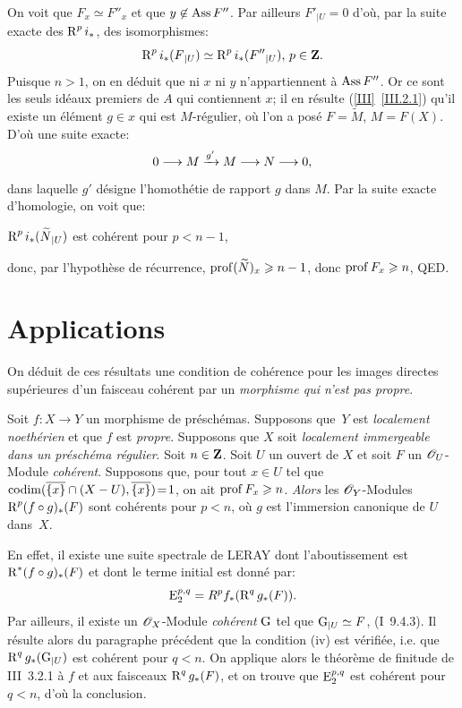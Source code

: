 \noindent On voit que $F_x\simeq F''_x$ et que $y\not\in \operatorname{Ass} F''$. Par ailleurs $F'{}_{|U}=0$ d'o\`u, par la suite exacte des $\operatorname{R}^pi_\ast$, des isomorphismes:
\[
\operatorname{R}^pi_\ast(F{}_{|U})\simeq \operatorname{R}^pi_\ast(F''{}_{|U})\text{, }p\in\mathbf{Z}.
\]
Puisque $n>1$, on en d\'eduit que ni $x$ ni $y$ n'appartiennent \`a $\operatorname{Ass} F''$. Or ce sont les seuls id\'eaux premiers de $A$ qui contiennent $x$; il en r\'esulte (\ref{III}~\ref{III.2.1}) qu'il existe un \'el\'ement $g\in x$ qui est $M$-r\'egulier, o\`u l'on a pos\'e $F=\widetilde{M}$, $M=F(X)$. D'o\`u une suite exacte:
\[0\to M\lto{g'} M\to N \to 0,
\]
dans laquelle $g'$ d\'esigne l'homoth\'etie de rapport $g$ dans $M$. Par la suite exacte d'homologie, on voit que:

$\operatorname{R}^pi_\ast(\widetilde{N}{}_{|U})$ est coh\'erent pour $p<n-1$,

\noindent donc, par l'hypoth\`ese de r\'ecurrence, $\operatorname{prof}(\widetilde{N})_x\geqslant n-1$, donc $\operatorname{prof} F_x\geqslant n$, QED.

\section{Applications} \label{VIII.3}

On d\'eduit de ces r\'esultats une condition de coh\'erence pour les images directes sup\'erieures d'un faisceau coh\'erent par un \emph{morphisme qui n'est pas propre}.

\begin{theoreme} \label{VIII.3.1}
Soit $f\colon X\to Y$ un morphisme de pr\'esch\'emas. Supposons que~$Y$ est \emph{localement noethérien} et que $f$ est \emph{propre}. Supposons que $X$ soit \emph{localement immergeable dans un préschéma régulier}. Soit $n\in\mathbf{Z}$. Soit $U$ un ouvert de $X$ et soit $F$ un ${\mathscr O}_U$-Module \emph{cohérent}. Supposons que, pour tout $x\in U$ tel que \hbox{$\operatorname{codim}(\overline{\{x\}}\cap (X-U), \overline{\{x\}})\!=\!1$}, on ait $\operatorname{prof} F_x\geqslant n$. \emph{Alors} les ${\mathscr O}_Y$-Modules \hbox{$\operatorname{R}^p(f\circ g)_\ast(F)$} sont coh\'erents pour $p<n$, o\`u $g$ est l'immersion canonique de $U$ dans~$X$.
\end{theoreme}

En effet, il existe une suite spectrale de LERAY dont l'aboutissement est $\operatorname{R}^\ast(f\circ g)_\ast(F)$ et dont le terme initial est donn\'e par:
\[
\operatorname{E}^{p, q}_2=R^pf_\ast(\operatorname{R}^qg_\ast(F)).
\]
Par ailleurs, il existe un $\mathscr{O}_X$-Module \emph{cohérent} ${\operatorname{G}}$ tel que ${\operatorname{G}}{}_{|U}\simeq F$, (\EGA I~9.4.3). Il r\'esulte alors du paragraphe pr\'ec\'edent que la condition (iv) \ignorespaces est v\'erifi\'ee, i.e. que $\operatorname{R}^qg_\ast({\operatorname{G}}{}_{|U})$ est coh\'erent pour $q<n$. On applique alors le th\'eor\`eme de finitude de \EGA III~3.2.1 \`a $f$ et aux faisceaux $\operatorname{R}^qg_\ast(F)$, et on trouve que $\operatorname{E}^{p, q}_2$ est coh\'erent pour $q<n$, d'o\`u la conclusion.

